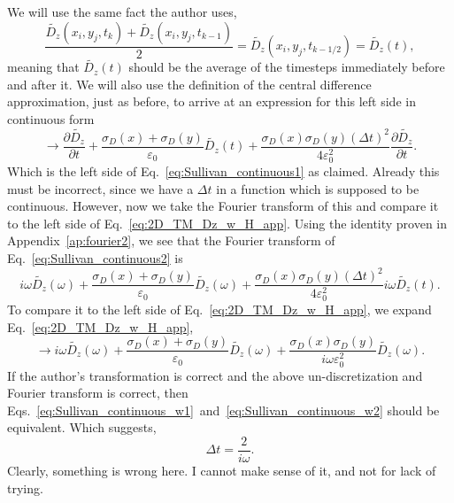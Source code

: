 \documentclass[12pt,twocolumn]{article}
\begin{document}
We will use the same fact the author uses,
\begin{equation}
\frac{\tilde{D_z}(x_i,y_j,t_k)+\tilde{D_z}(x_i,y_j,t_{k-1})}{2} = \tilde{D_z}(x_i,y_j,t_{k-1/2}) = \tilde{D_z}(t),
\end{equation}
meaning that $\tilde{D_z}(t)$ should be the average of the timesteps immediately before and after it. We will also use the definition of the central difference approximation, just as before, to arrive at an expression for this left side in continuous form
\begin{equation}
\label{eq:Sullivan_continuous2}
\rightarrow \frac{\partial\tilde{D_z}}{\partial t} + \frac{\sigma_D(x)+\sigma_D(y)}{\varepsilon_0}\tilde{D_z}(t) +\frac{\sigma_D(x)\sigma_D(y)\left(\Delta t\right)^2}{4\varepsilon_0^2}\frac{\partial \tilde{D_z}}{\partial t}.
\end{equation}
Which is the left side of Eq.~\ref{eq:Sullivan_continuous1} as claimed. Already this must be incorrect, since we have a $\Delta t$ in a function which is supposed to be continuous. However, now we take the Fourier transform of this and compare it to the left side of Eq.~\ref{eq:2D_TM_Dz_w_H_app}. Using the identity proven in Appendix~\ref{ap:fourier2}, we see that the Fourier transform of Eq.~\ref{eq:Sullivan_continuous2} is
\begin{equation}
\label{eq:Sullivan_continuous_w1}
i\omega\tilde{D_z}(\omega)+\frac{\sigma_D(x)+\sigma_D(y)}{\varepsilon_0}\tilde{D_z}(\omega) + \frac{\sigma_D(x)\sigma_D(y)\left(\Delta t\right)^2}{4\varepsilon_0^2}i\omega\tilde{D_z}(t).
\end{equation}
To compare it to the left side of Eq.~\ref{eq:2D_TM_Dz_w_H_app}, we expand Eq.~\ref{eq:2D_TM_Dz_w_H_app},
\begin{equation}
\label{eq:Sullivan_continuous_w2}
\rightarrow i\omega\tilde{D_z}(\omega)+\frac{\sigma_D(x)+\sigma_D(y)}{\varepsilon_0}\tilde{D_z}(\omega)+\frac{\sigma_D(x)\sigma_D(y)}{i\omega\varepsilon_0^2}\tilde{D_z}(\omega).
\end{equation}
If the author's transformation is correct and the above un-discretization and Fourier transform is correct, then Eqs.~\ref{eq:Sullivan_continuous_w1}~and~\ref{eq:Sullivan_continuous_w2} should be equivalent. Which suggests,
\begin{equation}
\Delta t = \frac{2}{i\omega}.
\end{equation}
Clearly, something is wrong here. I cannot make sense of it, and not for lack of trying.
\end{document}
